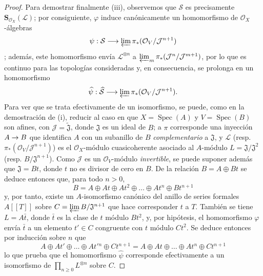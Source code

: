\documentclass[oneside,10pt]{amsart}
\makeatletter
\newcommand{\ega@arrow}[2]{\mathchoice{#1}{#2}{#2}{#2}}
\renewcommand{\to}{\ega@arrow{\longrightarrow}{\rightarrow}}
\makeatother
\begin{document}
\begin{proof}
Para demostrar finalmente (iii), observemos que $\mathcal{S}$ es precisamente $\mathbf{S}_{\mathcal{O}_X}(\mathcal{L})$;
por consiguiente, $\varphi$ induce canónicamente un homomorfismo de $\mathcal{O}_X$-álgebras
\[
  \psi:\mathcal{S}\longrightarrow
  \varprojlim\pi_*(\mathcal{O}_V/\mathcal{J}^{n+1})
\]
;
además, este homomorfismo envía $\mathcal{L}^{\otimes n}$ a $\varprojlim_m\pi_*(\mathcal{J}^n/\mathcal{J}^{m+1})$, por lo que es continuo para las topologías consideradas y, en consecuencia, se prolonga en un homomorfismo
\[
  \widehat{\psi}:\widehat{\mathcal{S}}\longrightarrow
  \varprojlim\pi_*(\mathcal{O}_V/\mathcal{J}^{n+1}).
\]
Para ver que se trata efectivamente de un isomorfismo, se puede, como en la demostración de (i), reducir al caso en que $X=\operatorname{Spec}(A)$ y $V=\operatorname{Spec}(B)$ son afines, con $\mathcal{J}=\widetilde{\mathfrak{J}}$, donde $\mathfrak{J}$ es un ideal de $B$;
a $\pi$ corresponde una inyección $A\to B$ que identifica $A$ con un subanillo de $B$ \emph{complementario} a $\mathfrak{J}$, y $\mathcal{L}$ (resp. $\pi_*(\mathcal{O}_V/\mathcal{J}^{n+1})$) es el $\mathcal{O}_X$-módulo cuasicoherente asociado al $A$-módulo $L=\mathfrak{J}/\mathfrak{J}^2$ (resp. $B/\mathfrak{J}^{n+1}$).
Como $\mathcal{J}$ es un $\mathcal{O}_V$-módulo \emph{invertible}, se puede suponer además que $\mathfrak{J}=Bt$, donde $t$ no es divisor de cero en $B$.
De la relación $B=A\oplus Bt$ se deduce entonces que, para todo $n>0$,
\[
  B=A\oplus At\oplus At^2\oplus\ldots\oplus At^n\oplus Bt^{n+1}
\]
y, por tanto, existe un $A$-isomorfismo canónico del anillo de series formales $A[[T]]$ sobre $C=\varprojlim B/\mathfrak{J}^{n+1}$ que hace corresponder $t$ a $T$.
También se tiene $L=A\bar t$, donde $\bar t$ es la clase de $t$ módulo $Bt^2$, y, por hipótesis, el homomorfismo $\varphi$ envía $\bar t$ a un elemento $t'\in C$ congruente con $t$ módulo $Ct^2$.
Se deduce entonces por inducción sobre $n$ que
\[
  A\oplus At'\oplus\ldots\oplus At'{}^n\oplus Ct^{n+1}
  =A\oplus At\oplus\ldots\oplus At^n\oplus Ct^{n+1}
\]
lo que prueba que el homomorfismo $\widehat{\psi}$ corresponde efectivamente a un isomorfismo de $\prod_{n\geqslant0}L^{\otimes n}$ sobre $C$.
\end{proof}
\end{document}
